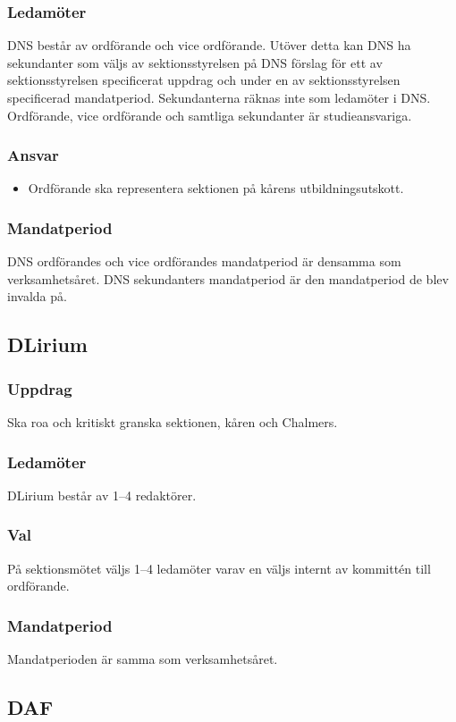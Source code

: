 \subsubsection{Ledamöter}
DNS består av ordförande och vice ordförande. 
Utöver detta kan DNS ha sekundanter som väljs av sektionsstyrelsen på DNS förslag för ett av sektionsstyrelsen specificerat uppdrag och under en av sektionsstyrelsen specificerad mandatperiod. 
Sekundanterna räknas inte som ledamöter i DNS.
Ordförande, vice ordförande och samtliga sekundanter är studieansvariga.
\subsubsection{Ansvar}
\begin{itemize}
  \item Ordförande ska representera sektionen på kårens utbildningsutskott.
\end{itemize}
\subsubsection{Mandatperiod}
DNS ordförandes och vice ordförandes mandatperiod är densamma som verksamhetsåret. DNS sekundanters mandatperiod är den mandatperiod de blev invalda på.

\subsection{DLirium}
\subsubsection{Uppdrag}
Ska roa och kritiskt granska sektionen, kåren och Chalmers. 
\subsubsection{Ledamöter}
DLirium består av 1--4 redaktörer.
\subsubsection{Val}
På sektionsmötet väljs 1--4 ledamöter varav en väljs internt av kommittén till ordförande.
\subsubsection{Mandatperiod}
Mandatperioden är samma som verksamhetsåret. 

\subsection{DAF}
